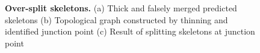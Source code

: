 \begin{figure}[t]
	\begin{subfigure}[b]{\hwidth}
		\caption{\label{fig:method_proposal_c}}
	\end{subfigure}
	\caption{{\bf Over-split skeletons.} (a) Thick and falsely merged predicted skeletons (b) Topological graph constructed by thinning and identified junction point (c) Result of splitting skeletons at junction point}
	\label{fig:method_proposal}
	\vspace{-0.1in}
\end{figure}


